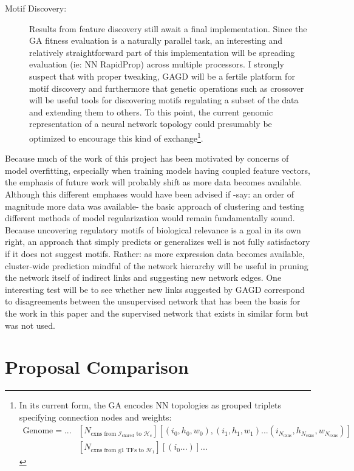 \documentclass[12pt,a4paper]{article}
\begin{document}
\begin{multicols}{2}
\begin{description}
\item[Motif Discovery:]{ Results from feature discovery still await a final implementation. Since the GA fitness evaluation is a naturally parallel task, an interesting and relatively straightforward part of this implementation will be spreading evaluation (ie: NN RapidProp) across multiple processors. I strongly suspect that with proper tweaking, GAGD will be a fertile platform for motif discovery and furthermore that genetic operations such as crossover will be useful tools for discovering motifs regulating a subset of the data and extending them to others. To this point, the current genomic representation of a neural network topology could presumably be optimized to encourage this kind of exchange\footnote{In its current form, the GA encodes NN topologies as grouped triplets specifying connection nodes and weights: 
\begin{align*} 
\text{Genome} =...&[N_{\text{cxns from $\mathcal{I}_{\text{shared}}$ to $\mathcal{H}_c$}}][(i_0,h_0,w_0),(i_1,h_1,w_1)...(i_{N_{\text{cxns}}},h_{N_{\text{cxns}}},w_{N_{\text{cxns}}})]\\
&[N_{\text{cxns from g1 TFs to $\mathcal{H}_1$}}][(i_0...)]...
\end{align*}
}. }
\end{description}


Because much of the work of this project has been motivated by concerns of model overfitting, especially when training models having coupled feature vectors, the emphasis of future work will probably shift as more data becomes available. Although this different emphases would have been advised if -say: an order of magnitude more data was available- the basic approach of clustering and testing different methods of model regularization would remain fundamentally sound. Because uncovering regulatory motifs of biological relevance is a goal in its own right, an approach that simply predicts or generalizes well is not fully satisfactory if it does not suggest motifs. Rather: as more expression data becomes available, cluster-wide prediction mindful of the network hierarchy will be useful in pruning the network itself of indirect links and suggesting new network edges. One interesting test will be to see whether new links suggested by GAGD correspond to disagreements between the unsupervised network that has been the basis for the work in this paper and the supervised network that exists in similar form but was not used. 


\section{Proposal Comparison}


\end{multicols}
\end{document}
